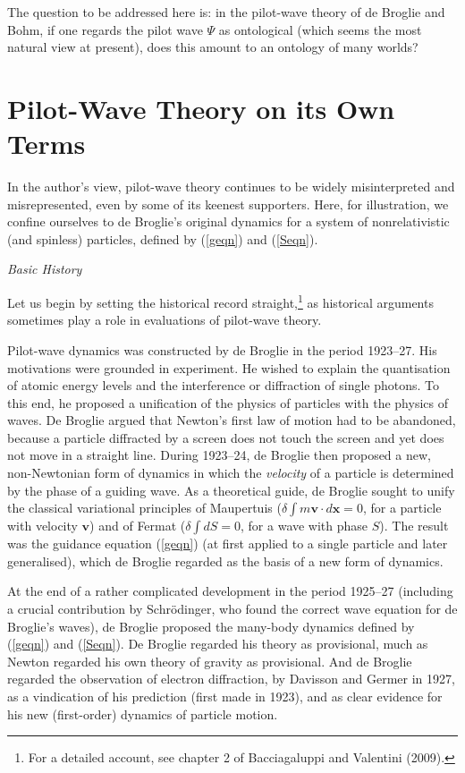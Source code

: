 \documentclass[12pt]{article}%
\begin{document}
The question to be addressed here is: in the pilot-wave theory of de Broglie
and Bohm, if one regards the pilot wave $\Psi$ as ontological (which seems the
most natural view at present), does this amount to an ontology of many worlds?

\section{Pilot-Wave Theory on its Own Terms}

In the author's view, pilot-wave theory continues to be widely misinterpreted
and misrepresented, even by some of its keenest supporters. Here, for
illustration, we confine ourselves to de Broglie's original dynamics for a
system of nonrelativistic (and spinless) particles, defined by (\ref{geqn})
and (\ref{Seqn}).

\begin{center}
\textit{Basic History}
\end{center}

Let us begin by setting the historical record straight,\footnote{For a
detailed account, see chapter 2 of Bacciagaluppi and Valentini (2009).} as
historical arguments sometimes play a role in evaluations of pilot-wave theory.

Pilot-wave dynamics was constructed by de Broglie in the period 1923--27. His
motivations were grounded in experiment. He wished to explain the quantisation
of atomic energy levels and the interference or diffraction of single photons.
To this end, he proposed a unification of the physics of particles with the
physics of waves. De Broglie argued that Newton's first law of motion had to
be abandoned, because a particle diffracted by a screen does not touch the
screen and yet does not move in a straight line. During 1923--24, de Broglie
then proposed a new, non-Newtonian form of dynamics in which the
\textit{velocity} of a particle is determined by the phase of a guiding wave.
As a theoretical guide, de Broglie sought to unify the classical variational
principles of Maupertuis ($\delta\int m\mathbf{v}\cdot d\mathbf{x}=0$, for a
particle with velocity $\mathbf{v}$) and of Fermat ($\delta\int dS=0$, for a
wave with phase $S$). The result was the guidance equation (\ref{geqn}) (at
first applied to a single particle and later generalised), which de Broglie
regarded as the basis of a new form of dynamics.

At the end of a rather complicated development in the period 1925--27
(including a crucial contribution by Schr\"{o}dinger, who found the correct
wave equation for de Broglie's waves), de Broglie proposed the many-body
dynamics defined by (\ref{geqn}) and (\ref{Seqn}). De Broglie regarded his
theory as provisional, much as Newton regarded his own theory of gravity as
provisional. And de Broglie regarded the observation of electron diffraction,
by Davisson and Germer in 1927, as a vindication of his prediction (first made
in 1923), and as clear evidence for his new (first-order) dynamics of particle motion.
\end{document}
